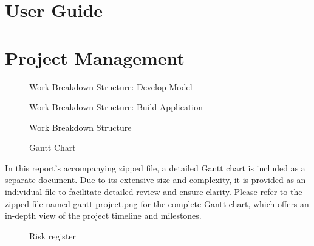 \documentclass[preprint,12pt,review,authoryear]{elsarticle}
\begin{document}
\section{User Guide}
\renewcommand{\thepage}{I\arabic{page}}
\newpage
\section{Project Management}
\renewcommand{\thepage}{J\arabic{page}} %
\begin{figure}[ht]
    
    \caption{Work Breakdown Structure: Develop Model}
    \label{fig:WBS: Develop Model}
\end{figure}
\newpage
\begin{landscape}
    \begin{figure}[ht]
        
        \caption{Work Breakdown Structure: Build Application}
        \label{fig:WBS: Build Application}
    \end{figure}
\end{landscape}
\newpage
\begin{figure}[ht]
    
    \caption{Work Breakdown Structure}
    \label{fig:WBS: Project Charter}
\end{figure}
\newpage
\begin{landscape}
    \begin{figure}[ht]
        \centering
        \caption{Gantt Chart}
        \label{fig:GanttChart}
    \end{figure}
    In this report's accompanying zipped file, a detailed Gantt chart is included as a separate document. Due to its extensive size and complexity, it is provided as an individual file to facilitate detailed review and ensure clarity. Please refer to the zipped file named gantt-project.png for the complete Gantt chart, which offers an in-depth view of the project timeline and milestones.
\end{landscape}
\begin{figure}[ht]
    
    \caption{Risk register}
    \label{fig:Risk Register}
\end{figure}
\newpage
\end{document}
